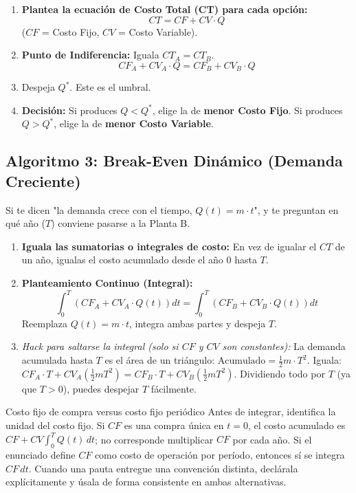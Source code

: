 \begin{enumerate}
    \item \textbf{Plantea la ecuación de Costo Total (CT) para cada opción:} 
    $$ CT = CF + CV \cdot Q $$
    ($CF$ = Costo Fijo, $CV$ = Costo Variable).
    \item \textbf{Punto de Indiferencia:} Iguala $CT_A = CT_B$.
    $$ CF_A + CV_A \cdot Q = CF_B + CV_B \cdot Q $$
    \item Despeja $Q^*$. Este es el umbral.
    \item \textbf{Decisión:} Si produces $Q < Q^*$, elige la de \textbf{menor Costo Fijo}. Si produces $Q > Q^*$, elige la de \textbf{menor Costo Variable}.
\end{enumerate}

\subsection{Algoritmo 3: Break-Even Dinámico (Demanda Creciente)}
Si te dicen "la demanda crece con el tiempo, $Q(t) = m \cdot t$", y te preguntan en qué año ($T$) conviene pasarse a la Planta B.

\begin{enumerate}
    \item \textbf{Iguala las sumatorias o integrales de costo:}
    En vez de igualar el $CT$ de un año, igualas el costo acumulado desde el año 0 hasta $T$.
    \item \textbf{Planteamiento Continuo (Integral):}
    $$ \int_{0}^{T} (CF_A + CV_A \cdot Q(t)) dt = \int_{0}^{T} (CF_B + CV_B \cdot Q(t)) dt $$
    Reemplaza $Q(t) = m \cdot t$, integra ambas partes y despeja $T$.
    \item \textit{Hack para saltarse la integral (solo si $CF$ y $CV$ son constantes):}
    La demanda acumulada hasta $T$ es el área de un triángulo: $\text{Acumulado} = \frac{1}{2} m \cdot T^2$.
    Iguala: $CF_A \cdot T + CV_A (\frac{1}{2} m T^2) = CF_B \cdot T + CV_B (\frac{1}{2} m T^2)$. Dividiendo todo por $T$ (ya que $T>0$), puedes despejar $T$ fácilmente.
\end{enumerate}

\begin{trampa}{Costo fijo de compra versus costo fijo periódico}
Antes de integrar, identifica la unidad del costo fijo. Si $CF$ es una compra
única en $t=0$, el costo acumulado es
$CF + CV\int_0^T Q(t)\,dt$; no corresponde multiplicar $CF$ por cada año.
Si el enunciado define $CF$ como costo de operación por período, entonces sí se
integra $CF\,dt$. Cuando una pauta entregue una convención distinta, declárala
explícitamente y úsala de forma consistente en ambas alternativas.
\end{trampa}

